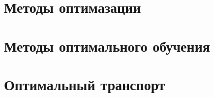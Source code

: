 

\section{Методы оптимазации}



\section{Методы оптимального обучения}



\section{Оптимальный транспорт}


